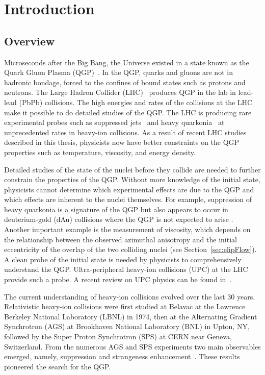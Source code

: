 \chapter{Introduction}
  \section{Overview}
  Microseconds after the Big Bang, the Universe existed in a state known as
    the Quark Gluon Plasma (QGP)~\cite{Witten:1984rs,Vogt:1998kna}.
  In the QGP, quarks and gluons are not in hadronic bondage, forced to 
    the confines of bound states such as protons and neutrons.
  The Large Hadron Collider (LHC)~\cite{Evans:2008zzb} produces QGP in the lab in lead-lead (PbPb)
    collisions.
  The high energies and rates of the collisions at the LHC make it possible 
    to do detailed studies of the QGP. 
  The LHC is producing rare experimental probes such as suppressed jets~\cite{Gyulassy:1990ye} and 
    heavy quarkonia~\cite{Matsui:1986dk} at unprecedented rates in heavy-ion collisions. 
  As a result of recent LHC studies described in this thesis, physicists now 
    have better constraints on the QGP properties such as temperature, viscosity, 
    and energy density.

  Detailed studies of the state of the nuclei before they collide are needed to
    further constrain the properties of the QGP.
  Without more knowledge of the initial state, physicists cannot determine 
    which experimental effects are due to the QGP and which effects are 
    inherent to the nuclei themselves. 
  For example, suppression of heavy quarkonia is a signature of the QGP 
    but also appears to occur in deuterium-gold (dAu) collisions where the QGP 
    is not expected to arise \cite{dAuOniaPHENIX}. 
  Another important example is the measurement of viscosity, which depends on 
    the relationship between the observed azimuthal anisotropy and the 
    initial eccentricity of the overlap of the two colliding nuclei 
    (see Section~\ref{sec:elipFlow}). 
  A clean probe of the initial state is needed by physicists to comprehensively 
    understand the QGP.
  Ultra-peripheral heavy-ion collisions (UPC) at the LHC provide such a probe. 
  A recent review on UPC physics can be found in~\cite{Baltz:2007kq,Bertulani:2005ru}.

  The current understanding of heavy-ion collisions evolved over the
    last 30 years.
  Relativistic heavy-ion collisions were first studied at Belavac at the Lawrence 
    Berkeley National Laboratory (LBNL) in 1974, then at the 
    Alternating Gradient Synchrotron (AGS) at Brookhaven National Laboratory (BNL) 
    in Upton, NY, followed by the Super Proton Synchrotron (SPS) at CERN near 
    Geneva, Switzerland. 
  From the numerous AGS and SPS experiments two main observables emerged,
    namely, \JPsi{} suppression and strangeness enhancement~\cite{Margetis:2000sv}. 
  These results pioneered the search for the QGP. 

